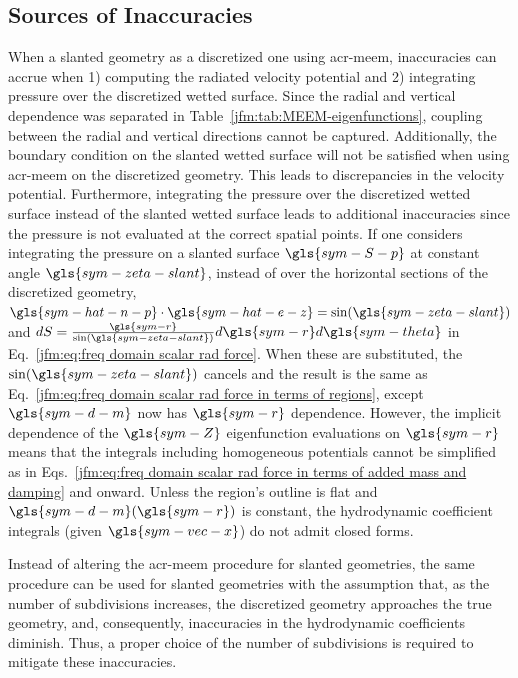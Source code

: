 \documentclass[lineno]{JFM-FLM_Au}
\begin{document}
\subsection{Sources of Inaccuracies}
When \modelling{} a slanted geometry as a discretized one using \gls{acr-meem}, inaccuracies can accrue when 1) computing the radiated velocity potential and 2) integrating pressure over the discretized wetted surface.
Since the radial and vertical dependence was separated in Table~\ref{jfm:tab:MEEM-eigenfunctions}, coupling between the radial and vertical directions cannot be captured.
Additionally, the boundary condition on the slanted wetted surface will not be satisfied when using \gls{acr-meem} on the discretized geometry.
This leads to discrepancies in the velocity potential.
Furthermore, integrating the pressure over the discretized wetted surface instead of the slanted wetted surface leads to additional inaccuracies since the pressure is not evaluated at the correct spatial points.
If one considers integrating the pressure on a slanted surface $\gls{sym-S-p}$ at constant angle $\gls{sym-zeta-slant}$, instead of over the horizontal sections of the discretized geometry, $\gls{sym-hat-n-p} \cdot \gls{sym-hat-e-z} = \sin(\gls{sym-zeta-slant})$ and $dS = \frac{\gls{sym-r}}{\sin(\gls{sym-zeta-slant})}d\gls{sym-r}d\gls{sym-theta}$ in Eq.~\ref{jfm:eq:freq domain scalar rad force}.
When these are substituted, the $\sin(\gls{sym-zeta-slant})$ cancels and the result is the same as Eq.~\ref{jfm:eq:freq domain scalar rad force in terms of regions}, except $\gls{sym-d-m}$ now has $\gls{sym-r}$ dependence.
However, the implicit dependence of the $\gls{sym-Z}$ eigenfunction evaluations on $\gls{sym-r}$ means that the integrals including homogeneous potentials cannot be simplified as in Eqs.~\ref{jfm:eq:freq domain scalar rad force in terms of added mass and damping} and onward.
Unless the region's outline is flat and $\gls{sym-d-m}(\gls{sym-r})$ is constant, the hydrodynamic coefficient integrals (given $\gls{sym-vec-x}$) do not admit closed forms. 

Instead of altering the \gls{acr-meem} procedure for slanted geometries, the same procedure can be used for \modelling{} slanted geometries with the assumption that, as the number of subdivisions increases, the discretized geometry approaches the true geometry, and, consequently, inaccuracies in the hydrodynamic coefficients diminish.
Thus, a proper choice of the number of subdivisions is required to mitigate these inaccuracies.
\end{document}
